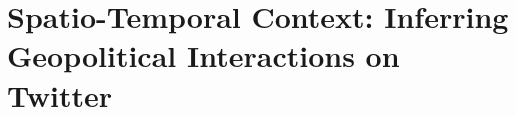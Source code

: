 \chapter[Spatio-Temporal Context: Inferring Geopolitical Interactions on Twitter]{Spatio-Temporal Context: Inferring Geopolitical Interactions on Twitter\raisebox{.3\baselineskip}{\normalsize\footnotemark}}
\label{chapter:geopolitical}






